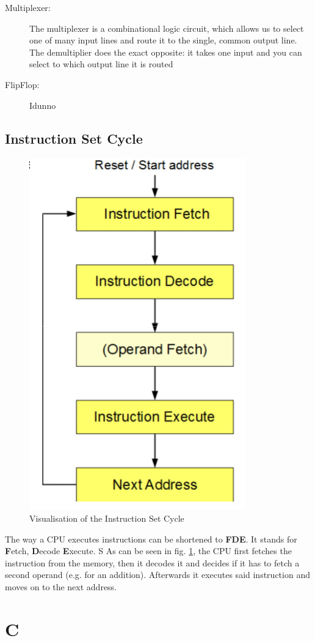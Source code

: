 \documentclass[a4paper, 11pt, nofootinbib]{article}
\begin{document}
\begin{description}
	\item[Multiplexer: ] The multiplexer is a combinational logic circuit, which allows us to select one of many input lines and route it to the single, common output line. The demultiplier does the exact opposite: it takes one input and you can select to which output line it is routed
	\item[FlipFlop: ] Idunno %
\end{description}

\subsection{Instruction Set Cycle}

\begin{figure}
	\centering
	\includegraphics[keepaspectratio=true,height=20\baselineskip]{instructionCycle.PNG}
	\caption{Visualisation of the Instruction Set Cycle}
	\label{fig:instCycle}
\end{figure}

The way a CPU executes instructions can be shortened to \textbf{FDE}. It stands for \textbf{F}etch, \textbf{D}ecode \textbf{E}xecute. 
\vspace{10px}
S
\noindent As can be seen in fig. \ref{fig:instCycle}, the CPU first fetches the instruction from the memory, then it decodes it and decides if it has to fetch a second operand (e.g. for an addition). Afterwards it executes said instruction and moves on to the next address.


\newpage
\section{C}
\end{document}
